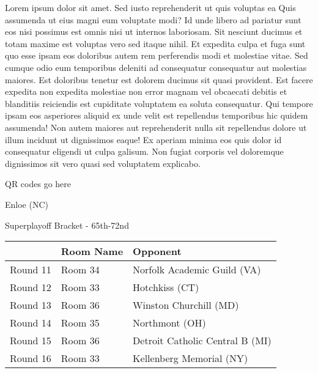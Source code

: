 \documentclass{article}%
\begin{document}
\vspace*{8pt}%
\linebreak%
\newline%
\newline%
    Lorem ipsum dolor sit amet. Sed iusto reprehenderit ut quis voluptas ea Quis assumenda ut eius magni eum voluptate modi? Id unde libero ad pariatur sunt eos nisi possimus est omnis nisi ut internos laboriosam. Sit nesciunt ducimus et totam maxime est voluptas vero sed itaque nihil. Et expedita culpa et fuga sunt quo esse ipsam eos doloribus autem rem perferendis modi et molestiae vitae.\newline%
\newline%
    Sed cumque odio eum temporibus deleniti ad consequatur consequatur aut molestias maiores. Est doloribus tenetur est dolorem ducimus sit quasi provident. Est facere expedita non expedita molestiae non error magnam vel obcaecati debitis et blanditiis reiciendis est cupiditate voluptatem ea soluta consequatur. Qui tempore ipsam eos asperiores aliquid ex unde velit est repellendus temporibus hic quidem assumenda!\newline%
\newline%
    Non autem maiores aut reprehenderit nulla sit repellendus dolore ut illum incidunt ut dignissimos eaque! Ex aperiam minima eos quis dolor id consequatur eligendi ut culpa galisum. Non fugiat corporis vel doloremque dignissimos sit vero quasi sed voluptatem explicabo.\newline%
\newline%
\vspace*{30pt}%
\begin{center}%
\begin{Huge}%
QR codes go here%
\end{Huge}%
\end{center}%
\newpage%
\begin{center}%
\begin{Huge}%
Enloe (NC)%
\end{Huge}%
\vspace*{8pt}%
\linebreak%
\begin{Large}%
Superplayoff Bracket {-} 65th{-}72nd%
\end{Large}%
\end{center}%
%
\begin{tabularx}{\textwidth}{|c|Y|Y|}%
\hline%
&Room Name&Opponent\\%
\hline%
Round 11&Room 34&Norfolk Academic Guild (VA)\\%
Round 12&Room 33&Hotchkiss (CT)\\%
Round 13&Room 36&Winston Churchill (MD)\\%
Round 14&Room 35&Northmont (OH)\\%
Round 15&Room 36&Detroit Catholic Central B (MI)\\%
Round 16&Room 33&Kellenberg Memorial (NY)\\%
\hline%
\end{tabularx}%
\end{document}
